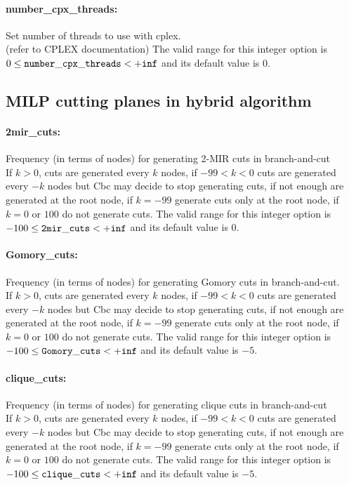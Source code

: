 \paragraph{number\_cpx\_threads:}\label{opt:number_cpx_threads} Set number of threads to use with cplex. \\
 (refer to CPLEX documentation) The valid range for this integer option is
$0 \le {\tt number\_cpx\_threads } <  {\tt +inf}$
and its default value is $0$.


\subsection{MILP cutting planes in hybrid algorithm}
\label{sec:MILPcuttingplanesinhybridalgorithm}
\paragraph{2mir\_cuts:}\label{opt:2mir_cuts} Frequency (in terms of nodes) for generating 2-MIR cuts in branch-and-cut \\
 If $k > 0$, cuts are generated every $k$ nodes, if $-99 < k < 0$ cuts are generated every $-k$ nodes but Cbc may decide to stop generating cuts, if not enough are generated at the root node, if $k=-99$ generate cuts only at the root node, if $k=0$ or $100$ do not generate cuts. The valid range for this integer option is
$-100 \le {\tt 2mir\_cuts } <  {\tt +inf}$
and its default value is $0$.


\paragraph{Gomory\_cuts:}\label{opt:Gomory_cuts} Frequency (in terms of nodes) for generating Gomory cuts in branch-and-cut. \\
 If $k > 0$, cuts are generated every $k$ nodes, if $-99 < k < 0$ cuts are generated every $-k$ nodes but Cbc may decide to stop generating cuts, if not enough are generated at the root node, if $k=-99$ generate cuts only at the root node, if $k=0$ or $100$ do not generate cuts. The valid range for this integer option is
$-100 \le {\tt Gomory\_cuts } <  {\tt +inf}$
and its default value is $-5$.


\paragraph{clique\_cuts:}\label{opt:clique_cuts} Frequency (in terms of nodes) for generating clique cuts in branch-and-cut \\
 If $k > 0$, cuts are generated every $k$ nodes, if $-99 < k < 0$ cuts are generated every $-k$ nodes but Cbc may decide to stop generating cuts, if not enough are generated at the root node, if $k=-99$ generate cuts only at the root node, if $k=0$ or $100$ do not generate cuts. The valid range for this integer option is
$-100 \le {\tt clique\_cuts } <  {\tt +inf}$
and its default value is $-5$.


